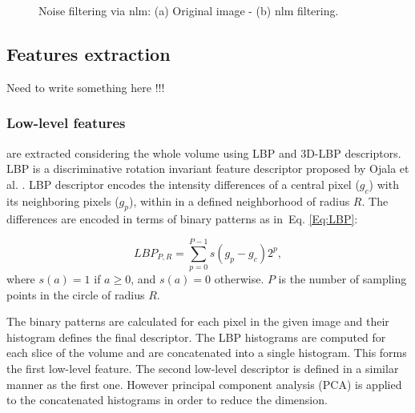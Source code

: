 \begin{figure}
  \centering
  \hspace*{\fill}
   \hfill
  \hspace*{\fill}
  \caption{Noise filtering via \ac{nlm}: (a) Original image - (b) \ac{nlm} filtering.}
  \label{fig:denoise}
\end{figure}

\subsection{Features extraction}
Need to write something here !!!


\subsubsection{Low-level features} are extracted considering the whole volume using LBP and 3D-LBP descriptors. 
LBP is a discriminative rotation invariant feature descriptor proposed by Ojala et al. \cite{ojala2002multiresolution}. 
LBP descriptor encodes the intensity differences of a central pixel ($g_c$) with its neighboring pixels ($g_{p}$), within in a defined neighborhood of radius $R$. The differences are encoded in terms of binary patterns as in~Eq. \ref{Eq:LBP}: 

\begin{equation} \label{Eq:LBP}
LBP_{P,R} = \sum_{p=0}^{P-1}s(g_{p} - g_{c})2^{p},
\end{equation}
where $s(a) = 1$ if $a \geq 0$, and $s(a)=0$ otherwise. $P$ is the number of sampling points in the circle of radius $R$.

The binary patterns are calculated for each pixel in the given image and their histogram defines the final descriptor.
The LBP histograms are computed for each slice of the volume and are concatenated into a single histogram. This forms the first low-level feature.
The second low-level descriptor is defined in a similar manner as the first one. However principal component analysis (PCA) is applied to the concatenated histograms in order to reduce the dimension.

